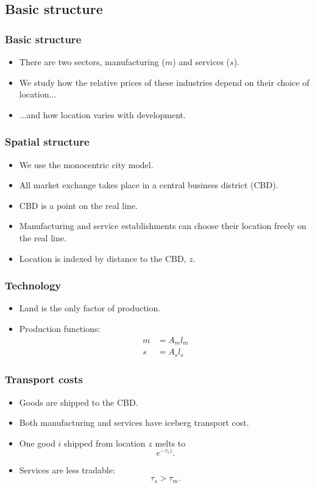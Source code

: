 \documentclass[compress,mathserif]{beamer}
\newcounter{perc}
\newcounter{percek}
\renewcommand{\time}[1]{\addtocounter{percek}{#1}}
\begin{document}
\subsection{Basic structure}
\begin{frame}\frametitle{Basic structure}
\begin{itemize}
    \item There are two sectors, manufacturing ($m$) and services ($s$).
    \item We study how the relative prices of these industries depend on their choice of location...
    \item ...and how location varies with development.
\end{itemize}
\end{frame}

\begin{frame}\frametitle{Spatial structure}
\begin{itemize}
    \item We use the monocentric city model.
    \item All market exchange takes place in a central business district (CBD).
    \item CBD is a point on the real line.
    \item Manufacturing and service establishments can choose their location freely on the real line.
    \item Location is indexed by distance to the CBD, $z$.
\end{itemize}
\end{frame}

\time{2}

\begin{frame}\frametitle{Technology}
\begin{itemize}
    \item Land is the only factor of production.
    \item Production functions:
\begin{align*}
m&=A_ml_m\\
s&=A_sl_s
\end{align*}
\end{itemize}
\end{frame}

\time{1}

\begin{frame}\frametitle{Transport costs}
\begin{itemize}
    \item Goods are shipped to the CBD.
    \item Both manufacturing and services have iceberg transport cost.
    \item One good $i$ shipped from location $z$ melts to \hyperlink{Dz-exp}{}
    \[
    {e}^{-\tau_iz}.
    \]
    \item Services are less tradable:
    \[
    \tau_s>\tau_m.
    \]
\end{itemize}
\end{frame}
\time{2}
\end{document}
